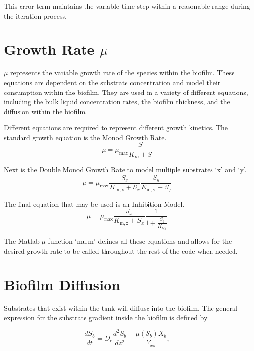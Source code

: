 \documentclass[letterpaper, twoside]{article}
\numberwithin{equation}{section}
\begin{document}
This error term maintains the variable time-step within a reasonable range during the iteration process.

\section{Growth Rate $\mu$}\label{sec:mu}
$\mu$ represents the variable growth rate of the species within the biofilm. These equations are dependent on the substrate concentration and model their consumption within the biofilm. They are used in a variety of different equations, including the bulk liquid concentration rates, the biofilm thickness, and the diffusion within the biofilm.

Different equations are required to represent different growth kinetics. The standard growth equation is the Monod Growth Rate.
\begin{equation} \label{eq: MonodGrowthRate}
  \mu=\mu_\mathrm{max} \frac{S}{K_m + S}
\end{equation}

Next is the Double Monod Growth Rate to model multiple substrates `x' and `y'.
\begin{equation} \label{eq: DoubleMonodGrowthRate}
  \mu=\mu_\mathrm{max} \frac{S_x}{K_\mathrm{m,x} + S_x} \frac{S_y}{K_\mathrm{m,y} + S_y}
\end{equation}

The final equation that may be used is an Inhibition Model.
\begin{equation} \label{eq: Inhibition}
  \mu=\mu_\mathrm{max} \frac{S_x}{K_\mathrm{m,x} + S_x} \frac{1}{1 + \frac{S_y}{K_{i,y}}}
\end{equation}

The Matlab $\mu$ function `mu.m' defines all these equations and allows for the desired growth rate to be called throughout the rest of the code when needed.
  

\section{Biofilm Diffusion}
Substrates that exist within the tank will diffuse into the biofilm. The general expression for the substrate gradient inside the biofilm is defined by

\begin{equation} \label{eq:substrate gradient}
\frac{dS_b}{dt} = {D_e}\frac{d^2S_b}{dz^2} - \frac{\mu(S_b) X_b}{Y_{xs}},
\end{equation}
\end{document}
